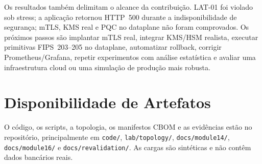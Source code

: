 \documentclass[12pt]{article}
\begin{document}
Os resultados tamb\'em delimitam o alcance da contribui\c{c}\~ao. LAT-01 foi violado sob stress; a aplica\c{c}\~ao retornou HTTP~500 durante a indisponibilidade de seguran\c{c}a; mTLS, KMS real e PQC no dataplane n\~ao foram comprovados. Os pr\'oximos passos s\~ao implantar mTLS real, integrar KMS/HSM realista, executar primitivas FIPS~203--205 no dataplane, automatizar rollback, corrigir Prometheus/Grafana, repetir experimentos com an\'alise estat\'istica e avaliar uma infraestrutura cloud ou uma simula\c{c}\~ao de produ\c{c}\~ao mais robusta.

\section*{Disponibilidade de Artefatos}
O c\'odigo, os scripts, a topologia, os manifestos CBOM e as evid\^encias est\~ao no reposit\'orio, principalmente em \texttt{code/}, \texttt{lab/topology/}, \texttt{docs/module14/}, \texttt{docs/module16/} e \texttt{docs/revalidation/}. As cargas s\~ao sint\'eticas e n\~ao cont\^em dados banc\'arios reais.



\end{document}
